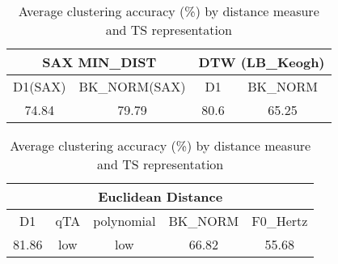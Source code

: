 \documentclass[12pt]{article}
\begin{document}
\begin{comment}
\begin{tabular}{ c | c | c | c | c }
  H1 & \multicolumn{4}{c}{H2} \\

  \hline\\
  T1 & test & \multicolumn{2}{c}{text} & text \\
  \hline\\
  T1 & \multicolumn{2}{c}{text} & \multicolumn{2}{c}{text} \\
  \hline\\
  T1 & text & text & text & text \\
\end{tabular}
\end{comment}



\begin{table}

 \caption{Average clustering accuracy (\%) by distance measure and TS representation }
 \label{table:zhangres}
 \begin{center}
 \begin{tabular}{|c|c|c|c|}
\hline

\multicolumn{2}{|c|}{SAX MIN\_DIST} & \multicolumn{2}{|c|}{DTW (LB\_Keogh)} \\  
\hline
  D1(SAX) & BK\_NORM(SAX) & D1 & BK\_NORM \\
  \hline
 74.84 & 79.79 & 80.6 & 65.25\\
 \hline
 \end{tabular}
 
 \begin{tabular}{|c|c|c|c|c|}

\hline
\multicolumn{5}{|c|}{Euclidean Distance} \\  \hline
D1 & qTA & polynomial & BK\_NORM & F0\_Hertz\\
\hline
81.86 & low & low & 66.82 & 55.68\\
\hline
\end{tabular}
\end{center}
\end{table}





\end{document}
